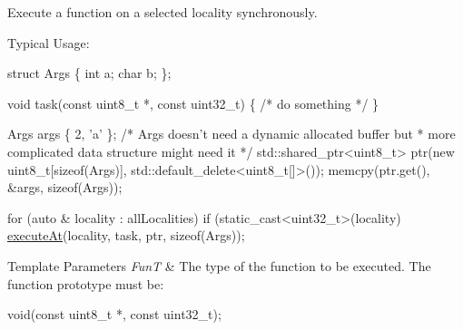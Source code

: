 Execute a function on a selected locality synchronously. 

Typical Usage\-: 
\begin{DoxyCode}
\textcolor{keyword}{struct }Args \{
  \textcolor{keywordtype}{int} a;
  \textcolor{keywordtype}{char} b;
\};

\textcolor{keywordtype}{void} task(\textcolor{keyword}{const} uint8\_t *, \textcolor{keyword}{const} uint32\_t) \{  \textcolor{comment}{/* do something */} \}

Args args \{ 2, \textcolor{charliteral}{'a'} \};
\textcolor{comment}{/* Args doesn't need a dynamic allocated buffer but}
\textcolor{comment}{ * more complicated data structure might need it */}
std::shared\_ptr<uint8\_t> ptr(\textcolor{keyword}{new} uint8\_t[\textcolor{keyword}{sizeof}(Args)],
                             std::default\_delete<uint8\_t[]>());
memcpy(ptr.get(), &args, \textcolor{keyword}{sizeof}(Args));

\textcolor{keywordflow}{for} (\textcolor{keyword}{auto} & locality : allLocalities)
  \textcolor{keywordflow}{if} (static\_cast<uint32\_t>(locality) %
    \hyperlink{namespaceshad_1_1rt_ae4b428e7e47fc07e01707b3abb01caa2}{executeAt}(locality, task, ptr, \textcolor{keyword}{sizeof}(Args));
\end{DoxyCode}



\begin{DoxyTemplParams}{Template Parameters}
{\em Fun\-T} & The type of the function to be executed. The function prototype must be\-: 
\begin{DoxyCode}
void(\textcolor{keyword}{const} uint8\_t *, \textcolor{keyword}{const} uint32\_t);
\end{DoxyCode}
\\
\hline
\end{DoxyTemplParams}

